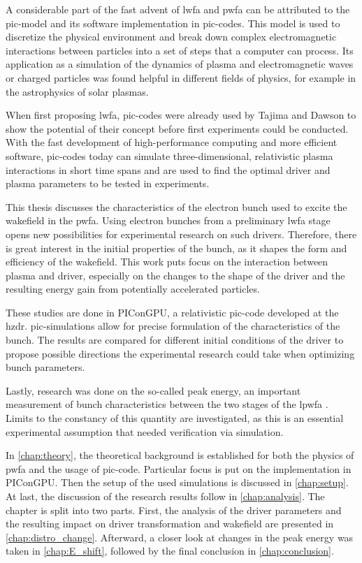 \documentclass[bachelor_thesis]{subfiles}
\begin{document}
A considerable part of the fast advent of \gls{lwfa} and \gls{pwfa} can be attributed to the \gls{pic}-model and its software implementation in \gls{pic}-codes.
This model is used to discretize the physical environment and break down complex electromagnetic interactions between particles into a set of steps that a computer can process.
Its application as a simulation of the dynamics of plasma and electromagnetic waves or charged particles was found helpful in different fields of physics, for example in the astrophysics of solar plasmas.

When first proposing \gls{lwfa}, \gls{pic}-codes were already used by Tajima and Dawson to show the potential of their concept before first experiments could be conducted. 
With the fast development of high-performance computing and more efficient software, \gls{pic}-codes today can simulate three-dimensional, relativistic plasma interactions in short time spans
and are used to find the optimal driver and plasma parameters to be tested in experiments.

This thesis discusses the characteristics of the electron bunch used to excite the wakefield in the \gls{pwfa}.
Using electron bunches from a preliminary \gls{lwfa} stage opens new possibilities for experimental research on such drivers.
Therefore, there is great interest in the initial properties of the bunch, as it shapes the form and efficiency of the wakefield.
This work puts focus on the interaction between plasma and driver, especially on the changes to the shape of the driver and the resulting energy gain from potentially accelerated particles.

These studies are done in PIConGPU, a relativistic \gls{pic}-code developed at the \gls{hzdr}. \gls{pic}-simulations allow for precise formulation of the characteristics of the bunch.
The results are compared for different initial conditions of the driver to propose possible directions the experimental research could take when optimizing bunch parameters.

Lastly, research was done on the so-called peak energy, an important measurement of bunch characteristics between the two stages of the \gls{lpwfa} \cite{Schoebel2022}.
Limits to the constancy of this quantity are investigated, as this is an essential experimental assumption that needed verification via simulation.

In \autoref{chap:theory}, the theoretical background is established for both the physics of \gls{pwfa} and the usage of \gls{pic}-code. Particular focus is put on the implementation in PIConGPU.
Then the setup of the used simulations is discussed in \autoref{chap:setup}.
At last, the discussion of the research results follow in \autoref{chap:analysis}. The chapter is split into two parts. First, the analysis of the driver parameters and the resulting impact on driver transformation and wakefield are presented in \autoref{chap:distro_change}.
Afterward, a closer look at changes in the peak energy was taken in \autoref{chap:E_shift}, followed by the final conclusion in \autoref{chap:conclusion}.
\end{document}
